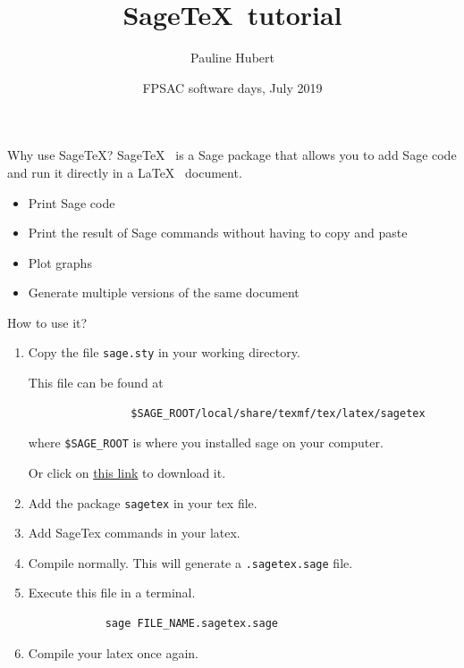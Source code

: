 \documentclass[10pts]{beamer}
\title{Sage\TeX ~tutorial}
\author{Pauline Hubert}
\date{FPSAC software days, July 2019}
\begin{document}
	\maketitle
	
	\begin{frame}{Why use Sage\TeX ?}
	Sage\TeX~ is a Sage package that allows you to add Sage code and run it directly in a \LaTeX~ document. \newline \pause
	
	\begin{itemize}
		\item Print Sage code
		\item Print the result of Sage commands without having to copy and paste
		\item Plot graphs
		\item Generate multiple versions of the same document
	\end{itemize}
	\end{frame}

	\begin{frame}[fragile]{How to use it?}
		\begin{enumerate}
			\item Copy the file \texttt{sage.sty} in your working directory. 
			
			This file can be found at 
			\begin{verbatim}
				$SAGE_ROOT/local/share/texmf/tex/latex/sagetex
			\end{verbatim}
			where \texttt{\$SAGE\_ROOT} is where you installed sage on your computer.
			
			Or click on \href{https://phubert.github.io/sagetex.sty}{this link} to download it.
			\item Add the package \texttt{sagetex} in your tex file.
			\item Add SageTex commands in your latex.
			\item Compile normally. This will generate a \texttt{.sagetex.sage} file. 
			\item Execute this file in a terminal.
			\begin{verbatim}
			sage FILE_NAME.sagetex.sage
			\end{verbatim} 
			\item Compile your latex once again. 
			 
		\end{enumerate}
	\end{frame}
\end{document}
